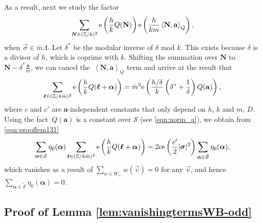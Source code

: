 \documentclass[10pt,a4paper]{amsart}
\def\CS{\mathcal{S}}
\def\ss{ \tilde{\mathcal{S}} }
\newcommand{\ZZ}{\mathbb{Z}}
\def\bal{\boldsymbol{\alpha}}
\def\bol{\boldsymbol{\ell}}
\def\ex{{\rm e}}
\theoremstyle{definition}
\numberwithin{equation}{section}
\begin{document}
As a result, next we study the factor
\[\sum_{\boldsymbol{N}\in (\ZZ/k)^2 } \ex\left(\frac{h}{k}Q(\mathbf{N})\right) \ex\left(\frac{h}{km}\left<\mathbf{N},\mathbf{a}\right>_Q\right),\]
 when $\vec \sigma \in \bar m \Lambda$. Let $\delta^*$ be the modular inverse of $\delta$ mod $k$. This exists because $\delta$ is a divisor of $h$, which is coprime with $k$. Shifting the summation over ${\boldsymbol N}$ to ${\boldsymbol N}-\delta^*{\frac{\mathbf{a}}{\bar m}} $, we can cancel the~$\left<\mathbf{N},\mathbf{a}\right>_Q$ term and arrive at the result that
\[
\sum_{\boldsymbol{\ell}\in (\ZZ/k\bar m)^2 }\ex\left(\frac{h}{k}Q(\bol+\bal)\right) = \bar m^2 \ex\left( {\frac{h/\delta}{k}}\left(\delta^\ast+{\frac{1}{\delta}}\right) Q(\mathbf{a})\right),
\]
where $c$ and $c'$ are $\mathbf{a}$-independent constants that only depend on $h$, $k$ and $m$, $D$. Using the fact~$Q(\mathbf{a})$ is a constant over $\CS$ (see \eqref{eqn:norm_a}), we obtain from \eqref{eqn:prooflem131}
\begin{equation*}
\sum_{\bal\in\CS} \eta_0(\bal) \sum_{\boldsymbol{\ell}\in (\ZZ/k\bar m)^2 }\ex\left(\frac{h}{k}Q(\bol+\bal)\right)
= 2 c \ex\left( {\frac{c'}{2}}|\boldsymbol{\sigma}|^2 \right) \sum_{\bal\in\ss}\eta_0 (\bal),
\end{equation*}
which vanishes as a result of $\sum_{w\in W_+} w(\vec v) =0$ for any $\vec v$, and hence $ \sum_{\bal\in\ss}\eta_0 (\bal)=0$.

\subsection{Proof of Lemma \ref{lem:vanishingtermsWB-odd}}
\label{pf_lem:vanishingtermsWB-odd}
\end{document}
